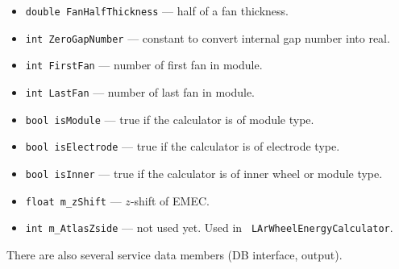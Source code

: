 \documentclass{article}
\begin{document}
\begin{itemize}
\item {\tt double FanHalfThickness} --- half of a fan thickness.
\item {\tt int ZeroGapNumber} --- 
constant to convert internal gap number into real.
\item {\tt int FirstFan} --- number of first fan in module.
\item {\tt int LastFan} --- number of last fan in module.
\item {\tt bool isModule} --- true if the calculator is of module type.
\item {\tt bool isElectrode} --- true if the calculator is of electrode type.
\item {\tt bool isInner} --- true if the calculator is of inner wheel or module
type.
\item {\tt float m\_zShift} --- $z$-shift of EMEC.
\item {\tt int m\_AtlasZside} --- not used yet. Used in {\tt
LArWheelEnergyCalculator}.
\end{itemize}

There are also several service data members (DB interface, output).
\end{document}
